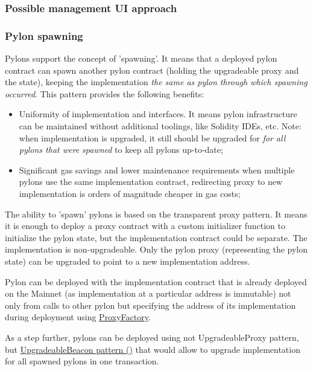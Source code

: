 \documentclass[12pt]{article}
\begin{document}
\subsubsection{Possible management UI approach}

\subsubsection{Pylon spawning}

Pylons support the concept of 'spawning'. It means that a deployed pylon contract can spawn another pylon contract (holding the upgradeable proxy and the state), keeping the implementation \emph{the same as pylon through which spawning occurred}. This pattern provides the following benefits:
\begin{itemize}
\item{Uniformity of implementation and interfaces. It means pylon infrastructure can be maintained without additional toolings, like Solidity IDEs, etc. Note: when implementation is upgraded, it still should be upgraded for \emph{for all pylons that were spawned} to keep all pylons up-to-date;}
\item{Significant gas savings and lower maintenance requirements when multiple pylons use the same implementation contract, redirecting proxy to new implementation is orders of magnitude cheaper in gas costs;}
\end{itemize}

The ability to 'spawn' pylons is based on the transparent proxy pattern. It means it is enough to deploy a proxy contract with a custom initializer function to initialize the pylon state, but the implementation contract could be separate. The implementation is non-upgradeable. Only the pylon proxy (representing the pylon state) can be upgraded to point to a new implementation address.

Pylon can be deployed with the implementation contract that is already deployed on the Mainnet (as implementation at a particular address is immutable) not only from calls to other pylon but specifying the address of its implementation during deployment using \href{https://forum.openzeppelin.com/t/programmatically-deploying-upgradeable-proxies/4834/2}{ProxyFactory}\cite{ProxyFactory}.

As a step further, pylons can be deployed using not UpgradeableProxy pattern, but \href{https://docs.openzeppelin.com/contracts/3.x/api/proxy}{UpgradeableBeacon pattern ()}\cite{UpgradeableBeacon} that would allow to upgrade implementation for all spawned pylons in one transaction.
\end{document}
